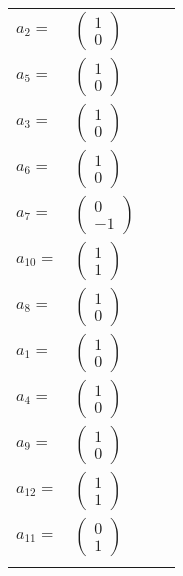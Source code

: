 \documentclass[1p]{elsarticle_modified}
\theoremstyle{definition}
\begin{document}
\begin{tabular}{m{7pt} m{180pt} m{7pt} m{180pt} }
\flushright $a_{2}=$&$\begin{pmatrix}1\\0\end{pmatrix}$ \\
\flushright $a_{5}=$&$\begin{pmatrix}1\\0\end{pmatrix}$ \\
\flushright $a_{3}=$&$\begin{pmatrix}1\\0\end{pmatrix}$ \\
\flushright $a_{6}=$&$\begin{pmatrix}1\\0\end{pmatrix}$ \\
\flushright $a_{7}=$&$\begin{pmatrix}0\\-1\end{pmatrix}$ \\
\flushright $a_{10}=$&$\begin{pmatrix}1\\1\end{pmatrix}$ \\
\flushright $a_{8}=$&$\begin{pmatrix}1\\0\end{pmatrix}$ \\
\flushright $a_{1}=$&$\begin{pmatrix}1\\0\end{pmatrix}$ \\
\flushright $a_{4}=$&$\begin{pmatrix}1\\0\end{pmatrix}$ \\
\flushright $a_{9}=$&$\begin{pmatrix}1\\0\end{pmatrix}$ \\
\flushright $a_{12}=$&$\begin{pmatrix}1\\1\end{pmatrix}$ \\
\flushright $a_{11}=$&$\begin{pmatrix}0\\1\end{pmatrix}$\\&\end{tabular}
\end{document}
